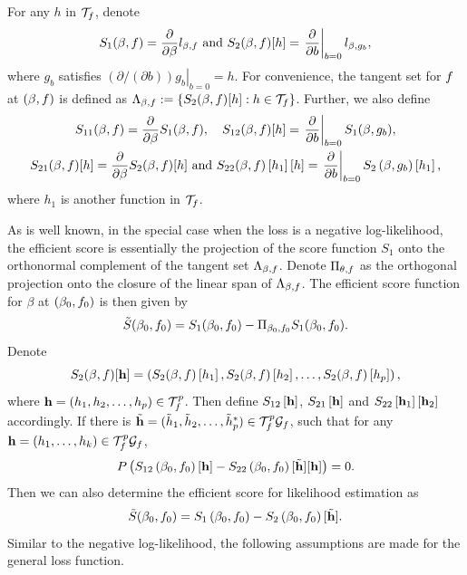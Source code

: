 For any $h$ in $\mathcal{T}_{f}$, denote
$$
S_1(\beta, f) = 
\frac{\partial}{\partial \beta} l_{\beta, f}  \text { and } S_2(\beta, f)[h]=\left.\frac{\partial}{\partial b}\right|_{b=0} l_{\beta, g_b}, 
$$
where $g_b$ satisfies $\left.(\partial /(\partial b)) g_b\right|_{b=0}=h$. 
For convenience, the tangent set for $f$ at $(\beta,f)$ is defined as $\Lambda_{\beta,f}:=\{ S_2(\beta, f)[h]: h\in \mathcal{T}_{f } \}$.  
Further, we also define 
$$
\begin{gathered}
S_{11}(\beta, f)=\frac{\partial}{\partial \beta} S_1(\beta, f), 
\quad S_{12}(\beta, f)[h]=\left.\frac{\partial}{\partial b}\right|_{b=0} S_1(\beta, g_b), \\
S_{21}(\beta, f)[h]=\frac{\partial}{\partial \beta} S_2(\beta, f)[h]\text { and } 
S_{22}(\beta, f)\left[h_1\right]\left[h\right]=\left.\frac{\partial}{\partial b}\right|_{b=0} S_2\left(\beta, g_b\right)\left[h_1\right],
\end{gathered}
$$
where $h_1$ is another function in $\mathcal{T}_{f}$.



As is well known, in the special case when the loss is a negative log-likelihood, the efficient score is essentially the projection of the score function $S_1$ onto the orthonormal complement of the tangent set $\Lambda_{\beta,f}$. Denote $\Pi_{\theta, f}$ as the orthogonal projection onto the closure of the linear span of $\Lambda_{\beta,f}$. The efficient score function for $\beta$ at \((\beta_{0}, f_{0})\) is then given by
$$
\tilde{S}(\beta_{0}, f_{0})=S_1(\beta_{0}, f_{0})-\Pi_{\beta_{0}, f_{0}} S_1(\beta_{0}, f_{0}).
$$ 
Denote $$S_2(\beta, f)[\mathbf{h}]=\left(S_2(\beta, f)\left[h_1\right],S_2(\beta, f)\left[h_2\right], \ldots, S_2(\beta, f)\left[h_p\right]\right),$$ where $\mathbf{h}=\left(h_1,h_2, \ldots, h_p\right) \in \mathcal{T}_{f}^p$. 
Then define $S_{12}\left[\mathbf{h} \right]$, $S_{21}\left[\mathbf{h}\right]$  and $S_{22}\left[\mathbf{h}_1\right]\left[\mathbf{h}_2\right]$ accordingly. If there is $\tilde{\mathbf{h}}=(\tilde{h}_1, \tilde{h}_2, \ldots, \tilde{h}_p^*) \in \mathcal{T}_{f}^p\mathcal{G}_{f}$, such that for any $\mathbf{h}=\left(h_1, \ldots, h_k\right) \in \mathcal{T}_{f}^p\mathcal{G}_{f}$,
\begin{equation}\label{equ:lfd}
    P\left(S_{12}\left(\beta_{0}, f_{0}\right)[\mathbf{h}]-S_{22}\left(\beta_{0}, f_{0}\right)[\tilde{\mathbf{h}} ][\mathbf{h}]\right)=0. 
\end{equation}
Then we can also determine the efficient score for likelihood estimation as 
$$
\tilde{S}(\beta_{0}, f_{0}) = S_{1}\left(\beta_{0}, f_{0}\right)-S_{2}\left(\beta_{0}, f_{0}\right)[\tilde{\mathbf{h}} ]. 
$$
Similar to the negative log-likelihood, the following assumptions are made for the general loss function.


